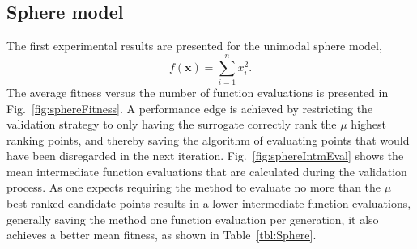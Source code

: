 \documentclass[conference]{IEEEtran}
\renewcommand{\vec}[1]{{\mbox{\boldmath$#1$}}}
\renewcommand{\vec}[1]{{\mathbf #1}}
\begin{document}
\subsection{Sphere model}\label{sec:sphere}
The first experimental results are presented for the unimodal sphere model, 
\begin{equation} f(\vec{x}) = \sum_{i=1}^nx_i^2.\end{equation}
The average fitness versus the number of function evaluations is presented in Fig.~\ref{fig:sphereFitness}. A performance edge is achieved by restricting the validation strategy to only having the surrogate correctly rank the $\mu$ highest ranking points, and thereby saving the algorithm of evaluating points that would have been disregarded in the next iteration. Fig.~\ref{fig:sphereIntmEval} shows the mean intermediate function evaluations that are calculated during the validation process. As one expects requiring the method to evaluate no more than the $\mu$ best ranked candidate points results in a lower intermediate function evaluations, generally saving the method one function evaluation per generation, it also achieves a better mean fitness, as shown in Table~\ref{tbl:Sphere}.
\end{document}
